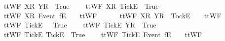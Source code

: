 \begin{isabellebody}
\ \ {\isachardoublequoteopen}ttWF{}\ {\isacharbrackleft}{\isacharbrackleft}X{\isacharbrackright}\isactrlsub R{\isacharbrackright}\ {\isacharbrackleft}{\isacharbrackleft}Y{\isacharbrackright}\isactrlsub R{\isacharbrackright}\ {\isacharequal}\ True{\isachardoublequoteclose}\ {\isacharbar}\ \isanewline
\ \ {\isachardoublequoteopen}ttWF{}\ {\isacharbrackleft}{\isacharbrackleft}X{\isacharbrackright}\isactrlsub R{\isacharbrackright}\ {\isacharbrackleft}{\isacharbrackleft}Tick{\isacharbrackright}\isactrlsub E{\isacharbrackright}\ {\isacharequal}\ True{\isachardoublequoteclose}\ {\isacharbar}\ \isanewline
\ \ {\isachardoublequoteopen}ttWF{}\ {\isacharbrackleft}{\isacharbrackleft}X{\isacharbrackright}\isactrlsub R{\isacharbrackright}\ {\isacharparenleft}{\isacharbrackleft}Event\ f{\isacharbrackright}\isactrlsub E\ {\isacharhash}\ {\isasymsigma}{\isacharparenright}\ {\isacharequal}\ ttWF{}\ {\isacharbrackleft}{\isacharbrackright}\ {\isasymsigma}{\isachardoublequoteclose}\ {\isacharbar}\ \isanewline
\ \ {\isachardoublequoteopen}ttWF{}\ {\isacharbrackleft}{\isacharbrackleft}X{\isacharbrackright}\isactrlsub R{\isacharbrackright}\ {\isacharparenleft}{\isacharbrackleft}Y{\isacharbrackright}\isactrlsub R\ {\isacharhash}\ {\isacharbrackleft}Tock{\isacharbrackright}\isactrlsub E\ {\isacharhash}\ {\isasymsigma}{\isacharparenright}\ {\isacharequal}\ ttWF{}\ {\isacharbrackleft}{\isacharbrackright}\ {\isasymsigma}{\isachardoublequoteclose}\ {\isacharbar}\ \isanewline
\ \ {\isachardoublequoteopen}ttWF{}\ {\isacharbrackleft}{\isacharbrackleft}Tick{\isacharbrackright}\isactrlsub E{\isacharbrackright}\ {\isacharbrackleft}{\isacharbrackright}\ {\isacharequal}\ True{\isachardoublequoteclose}\ {\isacharbar}\ \isanewline
\ \ {\isachardoublequoteopen}ttWF{}\ {\isacharbrackleft}{\isacharbrackleft}Tick{\isacharbrackright}\isactrlsub E{\isacharbrackright}\ {\isacharbrackleft}{\isacharbrackleft}Y{\isacharbrackright}\isactrlsub R{\isacharbrackright}\ {\isacharequal}\ True{\isachardoublequoteclose}\ {\isacharbar}\ \isanewline
\ \ {\isachardoublequoteopen}ttWF{}\ {\isacharbrackleft}{\isacharbrackleft}Tick{\isacharbrackright}\isactrlsub E{\isacharbrackright}\ {\isacharbrackleft}{\isacharbrackleft}Tick{\isacharbrackright}\isactrlsub E{\isacharbrackright}\ {\isacharequal}\ True{\isachardoublequoteclose}\ {\isacharbar}\ \isanewline
\ \ {\isachardoublequoteopen}ttWF{}\ {\isacharbrackleft}{\isacharbrackleft}Tick{\isacharbrackright}\isactrlsub E{\isacharbrackright}\ {\isacharparenleft}{\isacharbrackleft}Event\ f{\isacharbrackright}\isactrlsub E\ {\isacharhash}\ {\isasymsigma}{\isacharparenright}\ {\isacharequal}\ ttWF{}\ {\isacharbrackleft}{\isacharbrackright}\ {\isasymsigma}{\isachardoublequoteclose}\ {\isacharbar}\ \isanewline

\end{isabellebody}
